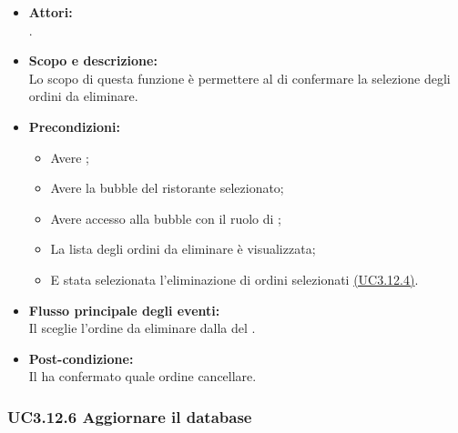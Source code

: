 \begin{itemize}
	\item \textbf{Attori:}
	\\.
	\item \textbf{Scopo e descrizione:} 
	\\Lo scopo di questa funzione è permettere al  di confermare la selezione degli ordini da eliminare.
	\item \textbf{Precondizioni:}
	\begin{itemize}
		\item Avere ;
		\item Avere la bubble del ristorante selezionato;
		\item Avere accesso alla bubble con il ruolo di ;
		\item La lista degli ordini da eliminare è visualizzata;
		\item E stata selezionata l’eliminazione di ordini selezionati \hyperref[UC3.12.4]{(UC3.12.4)}.
	\end{itemize}
	\item \textbf{Flusso principale degli eventi:}
	\\Il {} sceglie l’ordine da eliminare dalla  del .
	\item \textbf{Post-condizione:}
	\\Il {} ha confermato quale ordine cancellare.
\end{itemize}

\subsubsection{UC3.12.6 Aggiornare il database} \label{UC3.12.6}

